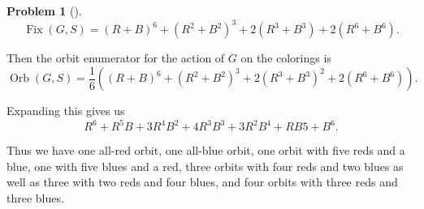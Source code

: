 \documentclass[10pt,]{book}
\theoremstyle{plain}
\theoremstyle{definition}
\newtheorem{activity}[project]{Problem}
\theoremstyle{definition}
\numberwithin{equation}{chapter}
\DeclareMathOperator{\Fix}{Fix}
\DeclareMathOperator{\Orb}{Orb}
\begin{document}
\begin{activity}[]
\begin{equation*}
\Fix(G,S)= (R+B)^6 +(R^2+B^2)^3 +2(R^3+B^3) + 2(R^6+B^6).
\end{equation*}
%
\par
Then the orbit enumerator for the action of \(G\) on the colorings is%
\begin{equation*}
\Orb(G,S)=\frac{1}{6}\left((R+B)^6 +(R^2+B^2)^3 +2(R^3+B^3)^2 +
2(R^6+B^6)\right).
\end{equation*}
%
\par
Expanding this gives us%
\begin{equation*}
R^6+R^5B+3R^4B^2+4R^3B^3+3R^2B^4+RB5+B^6.
\end{equation*}
%
\par
Thus we have one all-red orbit, one all-blue orbit, one orbit with five reds and a blue, one with five blues and a red, three orbits with four reds and two blues as well as three with two reds and four blues, and four orbits with three reds and three blues.%
\end{activity}
\end{document}
